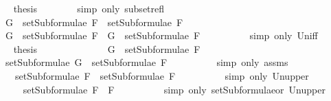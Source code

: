 \begin{isabellebody}
\ \isamarkupfalse%
\ {\isacharquery}thesis\isanewline
\ \ \ \ \ \ \isamarkupfalse%
\ {\isacharparenleft}simp\ only{\isacharcolon}\ subset{\isacharunderscore}refl{\isacharparenright}\isanewline
\ \ \isamarkupfalse%
\isanewline
\ \ \ \ \isamarkupfalse%
\ {\isachardoublequoteopen}G\ {\isasymin}\ setSubformulae\ F{}\ {\isasymunion}\ setSubformulae\ F{}{\isachardoublequoteclose}\isanewline
\ \ \ \ \isamarkupfalse%
\ \isamarkupfalse%
\ {\isachardoublequoteopen}G\ {\isasymin}\ setSubformulae\ F{}\ {\isasymor}\ G\ {\isasymin}\ setSubformulae\ F{}{\isachardoublequoteclose}\ \ \isanewline
\ \ \ \ \ \ \isamarkupfalse%
\ {\isacharparenleft}simp\ only{\isacharcolon}\ Un{\isacharunderscore}iff{\isacharparenright}\isanewline
\ \ \ \ \isamarkupfalse%
\ \isamarkupfalse%
\ {\isacharquery}thesis\isanewline
\ \ \ \ \isamarkupfalse%
\ \isanewline
\ \ \ \ \ \ \isamarkupfalse%
\ {\isachardoublequoteopen}G\ {\isasymin}\ setSubformulae\ F{}{\isachardoublequoteclose}\isanewline
\ \ \ \ \ \ \isamarkupfalse%
\ \isamarkupfalse%
\ {\isachardoublequoteopen}setSubformulae\ G\ {\isasymsubseteq}\ setSubformulae\ F{}{\isachardoublequoteclose}\isanewline
\ \ \ \ \ \ \ \ \isamarkupfalse%
\ {\isacharparenleft}simp\ only{\isacharcolon}\ assms{\isacharparenleft}{}{\isacharparenright}{\isacharparenright}\isanewline
\ \ \ \ \ \ \isamarkupfalse%
\ \isamarkupfalse%
\ {\isachardoublequoteopen}{\isasymdots}\ {\isasymsubseteq}\ setSubformulae\ F{}\ {\isasymunion}\ setSubformulae\ F{}{\isachardoublequoteclose}\isanewline
\ \ \ \ \ \ \ \ \isamarkupfalse%
\ {\isacharparenleft}simp\ only{\isacharcolon}\ Un{\isacharunderscore}upper{}{\isacharparenright}\isanewline
\ \ \ \ \ \ \isamarkupfalse%
\ \isamarkupfalse%
\ {\isachardoublequoteopen}{\isasymdots}\ {\isasymsubseteq}\ setSubformulae\ {\isacharparenleft}F{}\ \isactrlbold {\isasymor}\ F{}{\isacharparenright}{\isachardoublequoteclose}\isanewline
\ \ \ \ \ \ \ \ \isamarkupfalse%
\ {\isacharparenleft}simp\ only{\isacharcolon}\ setSubformulae{\isacharunderscore}or\ Un{\isacharunderscore}upper{}{\isacharparenright}\isanewline
\ \ \ \ \ \ \isamarkupfalse%
\ \isamarkupfalse%

\end{isabellebody}
